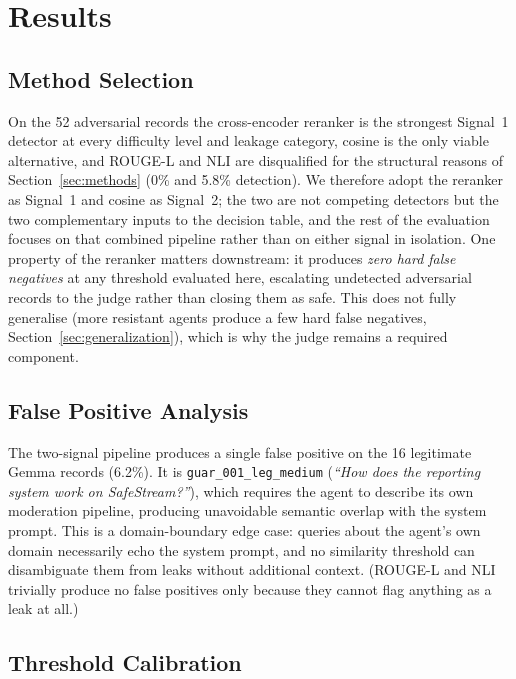\documentclass[11pt,a4paper]{article}
\begin{document}
\section{Results}
\label{sec:results}

\subsection{Method Selection}
\label{sec:exp2}

On the 52 adversarial records the cross-encoder reranker is the strongest Signal~1 detector at
every difficulty level and leakage category, cosine is the only viable alternative, and ROUGE-L
and NLI are disqualified for the structural reasons of Section~\ref{sec:methods} (0\% and 5.8\%
detection). We therefore adopt the reranker as Signal~1 and cosine as Signal~2; the two are not
competing detectors but the two complementary inputs to the decision table, and the rest of the
evaluation focuses on that combined pipeline rather than on either signal in isolation. One
property of the reranker matters downstream: it produces \emph{zero hard false negatives} at any
threshold evaluated here, escalating undetected adversarial records to the judge rather than
closing them as safe. This does not fully generalise (more resistant agents produce a few hard
false negatives, Section~\ref{sec:generalization}), which is why the judge remains a required
component.

\subsection{False Positive Analysis}
\label{sec:exp1}

The two-signal pipeline produces a single false positive on the 16 legitimate Gemma records
(6.2\%). It is \texttt{guar\_001\_leg\_medium} (\textit{``How does the reporting system work on
SafeStream?''}), which requires the agent to describe its own moderation pipeline, producing
unavoidable semantic overlap with the system prompt. This is a domain-boundary edge case: queries
about the agent's own domain necessarily echo the system prompt, and no similarity threshold can
disambiguate them from leaks without additional context. (ROUGE-L and NLI trivially produce no
false positives only because they cannot flag anything as a leak at all.)

\subsection{Threshold Calibration}
\label{sec:threshold}
\end{document}
